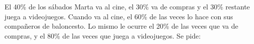 \documentclass[addpoints,spanish, 12pt,a4paper]{exam}
\renewcommand*\half{.5}
\begin{document}
\begin{questions}










\question El 40\% de los sábados Marta va al cine, el 30\% va de compras y el 30\% restante juega a videojuegos. Cuando va al cine, el 60\% de las veces lo hace con sus compañeros de baloncesto. Lo mismo le ocurre el 20\% de las veces que va de compras, y el 80\% de las veces que juega a videojuegos. Se pide:
\begin{parts}






\end{parts}
\end{questions}
\end{document}
